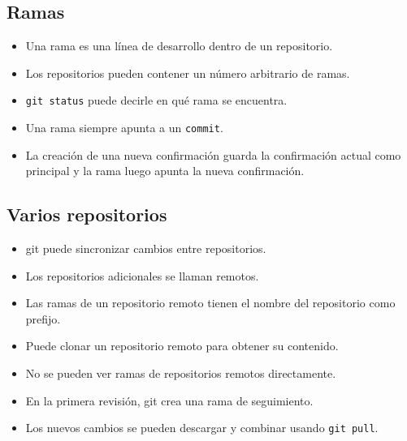 \subsection{Ramas}

\begin{itemize}
	\item Una rama es una línea de desarrollo dentro de un repositorio.
	\item Los repositorios pueden contener un número arbitrario de ramas.
	\item \lstinline|git status| puede decirle en qué rama se encuentra.
	\item Una rama siempre apunta a un \lstinline|commit|.
	\item La creación de una nueva confirmación guarda la confirmación actual como principal y la rama luego apunta la nueva confirmación.
\end{itemize}

\subsection{Varios repositorios}

\begin{itemize}
	\item git puede sincronizar cambios entre repositorios.
	\item Los repositorios adicionales se llaman remotos.
	\item Las ramas de un repositorio remoto tienen el nombre del repositorio como prefijo.
	\item Puede clonar un repositorio remoto para obtener su contenido.
	\item No se pueden ver ramas de repositorios remotos directamente.
	\item En la primera revisión, git crea una rama de seguimiento.
	\item Los nuevos cambios se pueden descargar y combinar usando \lstinline|git pull|.
\end{itemize}

